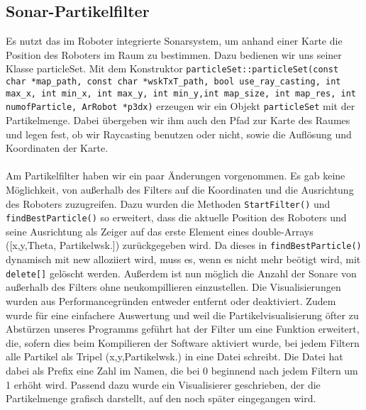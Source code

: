 \subsection{Sonar-Partikelfilter}
\label{sec:sonarparticlefilter}
Es nutzt das im Roboter integrierte
Sonarsystem, um anhand einer Karte die Position des Roboters im Raum
zu bestimmen. Dazu bedienen wir uns seiner Klasse particleSet. 
Mit dem Konstruktor \lstinline|particleSet::particleSet(const char *map_path, const char *wskTxT_path, bool use_ray_casting, int max_x, int min_x, int max_y, int min_y,int map_size, int map_res, int numofParticle, ArRobot *p3dx)| erzeugen wir ein Objekt
\lstinline|particleSet| mit der Partikelmenge. Dabei übergeben wir ihm auch den Pfad zur
Karte des Raumes und legen fest, ob wir Raycasting benutzen oder
nicht, sowie die Auflösung und Koordinaten der Karte.  \\\\
Am Partikelfilter haben wir ein paar Änderungen vorgenommen. Es gab keine
Möglichkeit, von außerhalb des Filters auf die Koordinaten und die
Ausrichtung des Roboters zuzugreifen. Dazu wurden die Methoden
\lstinline|StartFilter()|
und \lstinline|findBestParticle()| so erweitert, dass die aktuelle Position des Roboters
und seine Ausrichtung als Zeiger auf das erste Element eines double-Arrays
([x,y,Theta, Partikelwsk.]) zurückgegeben wird. Da dieses in
\lstinline|findBestParticle()| dynamisch mit new alloziiert wird, muss es, wenn es nicht
mehr beötigt wird, mit \lstinline|delete[]| gelöscht werden. Außerdem ist nun möglich
die Anzahl der Sonare von außerhalb des Filters ohne neukompillieren
einzustellen. Die Visualisierungen wurden aus Performancegründen entweder
entfernt oder deaktiviert. Zudem wurde für eine einfachere Auswertung und
weil die Partikelvisualisierung öfter zu Abstürzen unseres Programms
geführt hat der Filter um eine Funktion erweitert, die, sofern dies
beim Kompilieren der Software aktiviert wurde,  bei jedem Filtern alle Partikel als
Tripel (x,y,Partikelwsk.) in eine Datei schreibt. Die Datei hat
dabei als Prefix eine Zahl im Namen, die bei 0 beginnend nach jedem Filtern
 um 1 erhöht wird. Passend dazu wurde ein Visualisierer geschrieben, der
die Partikelmenge grafisch darstellt, auf den noch später eingegangen
wird.

